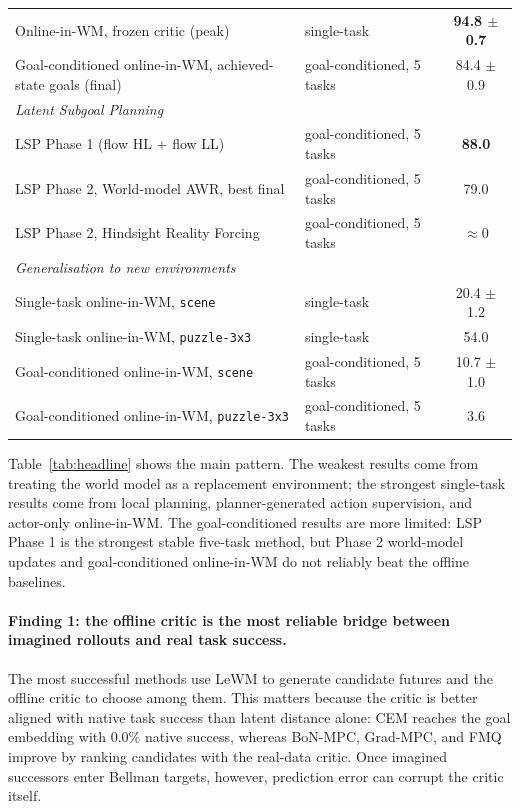 \begin{table}[h]
\begin{tabular}{llc}
Online-in-WM, frozen critic (peak) & single-task & \textbf{94.8 $\pm$ 0.7} \\
Goal-conditioned online-in-WM, achieved-state goals (final) & goal-conditioned, 5 tasks & 84.4 $\pm$ 0.9 \\
\midrule
\multicolumn{3}{l}{\emph{Latent Subgoal Planning}} \\
LSP Phase 1 (flow HL + flow LL) & goal-conditioned, 5 tasks & \textbf{88.0} \\
LSP Phase 2, World-model AWR, best final & goal-conditioned, 5 tasks & 79.0 \\
LSP Phase 2, Hindsight Reality Forcing & goal-conditioned, 5 tasks & $\approx 0$ \\
\midrule
\multicolumn{3}{l}{\emph{Generalisation to new environments}} \\
Single-task online-in-WM, \texttt{scene}  & single-task & 20.4 $\pm$ 1.2 \\
Single-task online-in-WM, \texttt{puzzle-3x3} & single-task & 54.0 \\
Goal-conditioned online-in-WM, \texttt{scene}  & goal-conditioned, 5 tasks & 10.7 $\pm$ 1.0 \\
Goal-conditioned online-in-WM, \texttt{puzzle-3x3} & goal-conditioned, 5 tasks & 3.6 \\
\bottomrule
\end{tabular}
\end{table}

Table~\ref{tab:headline} shows the main pattern. The weakest results
come from treating the world model as a replacement environment; the
strongest single-task results come from local planning,
planner-generated action supervision, and actor-only online-in-WM. The
goal-conditioned results are more limited: LSP Phase 1 is the strongest
stable five-task method, but Phase 2 world-model updates and
goal-conditioned online-in-WM do not reliably beat the offline
baselines.

\paragraph{Finding 1: the offline critic is the most reliable bridge
between imagined rollouts and real task success.}
The most successful methods use LeWM to generate candidate futures and
the offline critic to choose among them. This matters because the critic
is better aligned with native task success than latent distance alone:
CEM reaches the goal embedding with $0.0\%$ native success, whereas
BoN-MPC, Grad-MPC, and FMQ improve by ranking candidates with the
real-data critic. Once imagined successors enter Bellman targets,
however, prediction error can corrupt the critic itself.

